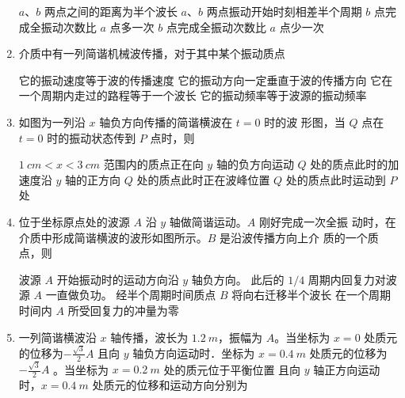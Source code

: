 \begin{enumerate}
\fourchoices
{$ a $、$ b $ 两点之间的距离为半个波长}
{$ a $、$ b $ 两点振动开始时刻相差半个周期}
{$ b $ 点完成全振动次数比 $ a $ 点多一次}
{$ b $ 点完成全振动次数比 $ a $ 点少一次}


\item 
{}
介质中有一列简谐机械波传播，对于其中某个振动质点  

\fourchoices
{它的振动速度等于波的传播速度}
{它的振动方向一定垂直于波的传播方向}
{它在一个周期内走过的路程等于一个波长}
{它的振动频率等于波源的振动频率}



\item 
{}
如图为一列沿 $ x $ 轴负方向传播的简谐横波在 $ t=0 $ 时的波
形图，当 $ Q $ 点在 $ t=0 $ 时的振动状态传到 $ P $ 点时，则  
\begin{figure}[h!]
	\centering
	
\end{figure}

\fourchoices
{$ 1 \ cm <x<3 \ cm $ 范围内的质点正在向 $ y $ 轴的负方向运动}
{$ Q $ 处的质点此时的加速度沿 $ y $ 轴的正方向}
{$ Q $ 处的质点此时正在波峰位置}
{$ Q $ 处的质点此时运动到 $ P $ 处}



\item 
{}
位于坐标原点处的波源 $ A $ 沿 $ y $ 轴做简谐运动。$ A $ 刚好完成一次全振
动时，在介质中形成简谐横波的波形如图所示。$ B $ 是沿波传播方向上介
质的一个质点，则  
\begin{figure}[h!]
	\centering
	
\end{figure}

\fourchoices
{波源 $ A $ 开始振动时的运动方向沿 $ y $ 轴负方向。}
{此后的 $ 1/4 $ 周期内回复力对波源 $ A $ 一直做负功。}
{经半个周期时间质点 $ B $ 将向右迁移半个波长}
{在一个周期时间内 $ A $ 所受回复力的冲量为零}


\item 
{}
一列简谐横波沿 $ x $ 轴传播，波长为 $ 1.2 \ m $，振幅为 $ A $。当坐标为 $ x=0 $ 处质元的位移为$ -\frac{\sqrt{3}}{2}A $  且向 $ y $ 轴负方向运动时．坐标为 $ x=0.4 \ m $ 处质元的位移为
$ -\frac{\sqrt{3}}{2}A $ 。当坐标为 $ x=0.2 \ m $ 处的质元位于平衡位置
且向 $ y $ 轴正方向运动时，$ x=0.4 \ m $ 处质元的位移和运动方向分别为  
\begin{figure}[h!]
	\centering
	
\end{figure}



\end{enumerate}

